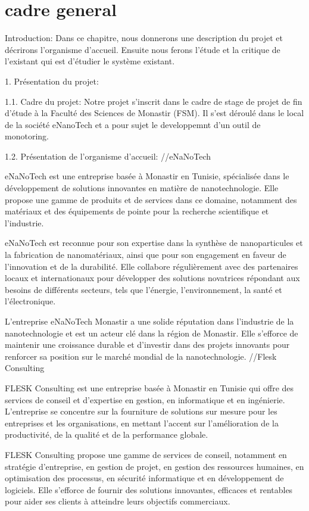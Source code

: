 \documentclass{report}
\begin{document}
\section{cadre general}
Introduction:
Dans ce chapitre, nous donnerons une description du projet et décrirons l’organisme d’accueil.
Ensuite nous ferons l’étude et la critique de l’existant qui est d’étudier le système existant.

1. Présentation du projet:

1.1. Cadre du projet:
Notre projet s’inscrit dans le cadre de stage de projet de fin d’étude à la Faculté des Sciences de Monastir (FSM). Il s’est déroulé dans le local de la société eNanoTech et a pour sujet le developpemnt d'un outil de monotoring.

1.2. Présentation de l’organisme d’accueil:
//eNaNoTech

eNaNoTech est une entreprise basée à Monastir en Tunisie, spécialisée dans le développement de solutions innovantes en matière de nanotechnologie. Elle propose une gamme de produits et de services dans ce domaine, notamment des matériaux et des équipements de pointe pour la recherche scientifique et l'industrie.

eNaNoTech est reconnue pour son expertise dans la synthèse de nanoparticules et la fabrication de nanomatériaux, ainsi que pour son engagement en faveur de l'innovation et de la durabilité. Elle collabore régulièrement avec des partenaires locaux et internationaux pour développer des solutions novatrices répondant aux besoins de différents secteurs, tels que l'énergie, l'environnement, la santé et l'électronique.

L'entreprise eNaNoTech Monastir a une solide réputation dans l'industrie de la nanotechnologie et est un acteur clé dans la région de Monastir. Elle s'efforce de maintenir une croissance durable et d'investir dans des projets innovants pour renforcer sa position sur le marché mondial de la nanotechnologie.
//Flesk Consulting

FLESK Consulting est une entreprise basée à Monastir en Tunisie qui offre des services de conseil et d'expertise en gestion, en informatique et en ingénierie. L'entreprise se concentre sur la fourniture de solutions sur mesure pour les entreprises et les organisations, en mettant l'accent sur l'amélioration de la productivité, de la qualité et de la performance globale.

FLESK Consulting propose une gamme de services de conseil, notamment en stratégie d'entreprise, en gestion de projet, en gestion des ressources humaines, en optimisation des processus, en sécurité informatique et en développement de logiciels. Elle s'efforce de fournir des solutions innovantes, efficaces et rentables pour aider ses clients à atteindre leurs objectifs commerciaux.
\end{document}
